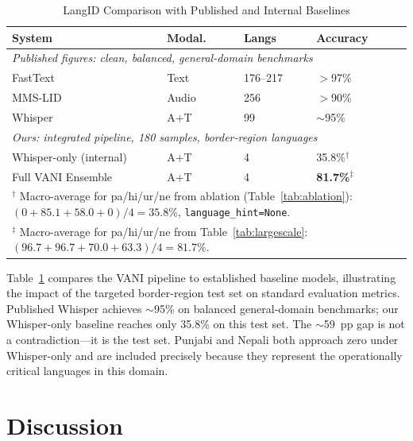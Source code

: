 \documentclass[conference]{IEEEtran}
\begin{document}
\begin{table}[htbp]
\caption{LangID Comparison with Published and Internal Baselines}
\label{tab:baselines}
\begin{center}
\begin{tabular}{llll}
\toprule
\textbf{System} & \textbf{Modal.} & \textbf{Langs} & \textbf{Accuracy} \\
\midrule
\multicolumn{4}{p{8cm}}{\footnotesize\textit{Published figures: clean, balanced, general-domain benchmarks}} \\
FastText~\cite{joulin2017bag} & Text & 176--217 & $>$97\% \\
MMS-LID~\cite{pratap2023scaling} & Audio & 256 & $>$90\% \\
Whisper~\cite{radford2022whisper} & A+T & 99 & $\sim$95\% \\
\midrule
\multicolumn{4}{p{8cm}}{\footnotesize\textit{Ours: integrated pipeline, 180 samples, border-region languages}} \\
Whisper-only (internal) & A+T & 4 & 35.8\%$^\dagger$ \\
Full VANI Ensemble & A+T & 4 & \textbf{81.7\%}$^\ddagger$ \\
\multicolumn{4}{p{7.5cm}}{\footnotesize $^\dagger$ Macro-average for pa/hi/ur/ne from ablation (Table~\ref{tab:ablation}): $(0+85.1+58.0+0)/4 = 35.8\%$, \texttt{language\_hint=None}.} \\
\multicolumn{4}{p{7.5cm}}{\footnotesize $^\ddagger$ Macro-average for pa/hi/ur/ne from Table~\ref{tab:largescale}: $(96.7+96.7+70.0+63.3)/4 = 81.7\%$.} \\
\bottomrule
\end{tabular}
\end{center}
\end{table}

Table~\ref{tab:baselines} compares the VANI pipeline to established baseline models, illustrating the impact of the targeted border-region test set on standard evaluation metrics. Published Whisper achieves $\sim$95\% on balanced general-domain benchmarks; our Whisper-only baseline reaches only 35.8\% on this test set. The $\sim$59~pp gap is not a contradiction---it is the test set. Punjabi and Nepali both approach zero under Whisper-only and are included precisely because they represent the operationally critical languages in this domain.

\section{Discussion}
\end{document}
